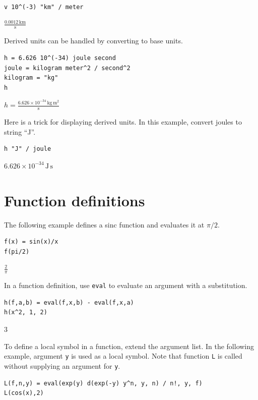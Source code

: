 \documentclass[12pt]{article}
\begin{document}
{\color{blue}
\begin{verbatim}
v 10^(-3) "km" / meter
\end{verbatim}}

$\displaystyle\frac{0.0012\,\text{km}}{\text{s}}$
\fi

\bigskip
Derived units can be handled by converting to base units.

{\color{blue}
\begin{verbatim}
h = 6.626 10^(-34) joule second
joule = kilogram meter^2 / second^2
kilogram = "kg"
h
\end{verbatim}}

$\displaystyle h=\frac{6.626\times10^{-34}\,\text{kg}\,\text{m}^2}{\text{s}}$

\bigskip
Here is a trick for displaying derived units.
In this example, convert joules to string ``J''.

{\color{blue}
\begin{verbatim}
h "J" / joule
\end{verbatim}}

$6.626\times10^{-34}\,\text{J}\,\text{s}$

\newpage

\section{Function definitions}

The following example defines a sinc function and evaluates it at $\pi/2$.

{\color{blue}
\begin{verbatim}
f(x) = sin(x)/x
f(pi/2)
\end{verbatim}}

$\displaystyle \frac{2}{\pi}$

\bigskip
In a function definition, use \verb$eval$ to evaluate an argument with a substitution.

{\color{blue}
\begin{verbatim}
h(f,a,b) = eval(f,x,b) - eval(f,x,a)
h(x^2, 1, 2)
\end{verbatim}}

$3$

\bigskip
To define a local symbol in a function, extend the argument list.
In the following example, argument \verb$y$ is used as a local symbol.
Note that function \verb$L$ is called without supplying an argument for \verb$y$.

{\color{blue}
\begin{verbatim}
L(f,n,y) = eval(exp(y) d(exp(-y) y^n, y, n) / n!, y, f)
L(cos(x),2)
\end{verbatim}
}
\end{document}
